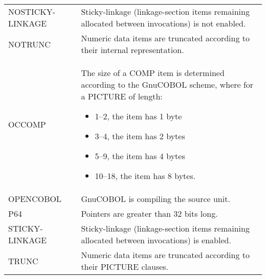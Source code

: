 \begin{centering}
\begin{longtable}[!h]{p{} p{}}
    NOSTICKY-LINKAGE & Sticky-linkage (linkage-section items remaining allocated between invocations) is not enabled. \\
    
    NOTRUNC & Numeric data items are truncated according to their internal representation. \\
    
    OCCOMP & The size of a COMP item is determined according to the GnuCOBOL scheme, where for a PICTURE of length:
    \begin{itemize}
    \item 1--2, the item has 1 byte
    \item 3--4, the item has 2 bytes
    \item 5--9, the item has 4 bytes
    \item 10--18, the item has 8 bytes.
    \end{itemize} \\
    
    OPENCOBOL & GnuCOBOL is compiling the source unit. \\
    
    P64 & Pointers are greater than 32 bits long. \\
    
    STICKY-LINKAGE & Sticky-linkage (linkage-section items remaining allocated between invocations) is enabled. \\
    
    TRUNC & Numeric data items are truncated according to their PICTURE clauses. \\
    \bottomrule
  \end{longtable}
\end{centering}


